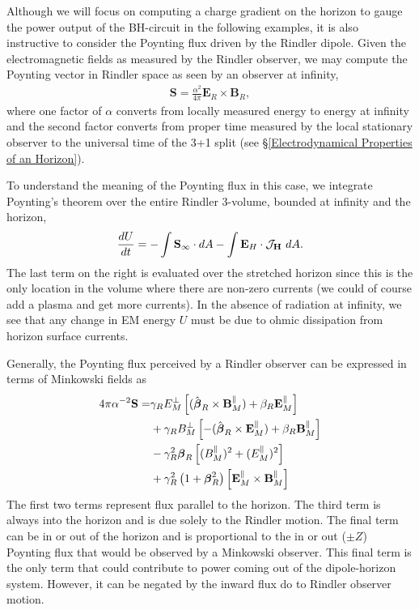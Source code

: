 Although we will focus on computing a charge gradient on the horizon
to gauge the power output of the BH-circuit in the following examples,
it is also instructive to
consider the Poynting flux driven by the Rindler dipole. Given the
electromagnetic fields as measured by the Rindler observer, we
may compute the Poynting vector in Rindler space as seen by an
observer at infinity,
\begin{align}
\mathbf{S} = \frac{\alpha^2}{4 \pi} \mathbf{E}_R \times \mathbf{B}_R,
\label{RPoynt}
\end{align}
where one factor of $\alpha$ converts from locally measured energy to energy at infinity and the second factor converts from proper time measured by the local stationary observer to the universal time of the 3+1 split (see \S \ref{Electrodynamical Properties  of an Horizon}).

To understand the meaning of the Poynting flux in this case, we integrate Poynting's theorem over the entire Rindler 3-volume, bounded at infinity and the horizon,
 \begin{align}
 \frac{d U}{dt} = -\int{ \mathbf{S}_{\infty} \cdot dA} - \int{ \mathbf{E}_H \cdot  \mathbf{\mathcal{J}_H}  \hbox{ }  dA}.
 \label{PoyntThm}
 \end{align}
The last term on the right is evaluated over the stretched horizon
since this is the only location in the volume where there are non-zero
currents (we could of course add a plasma and get more currents).  In
the absence of radiation at infinity, we see that any change in EM energy 
$U$ must be due to ohmic dissipation from horizon surface currents. 

Generally, the Poynting flux perceived by a Rindler observer can
be expressed in terms of Minkowski fields as 
\begin{align}
4\pi\alpha^{-2} {\bf S}= & \gamma_R E_M^\perp \left [ (\hat{\boldsymbol \beta}_R \times
  {\bf B}_M^\parallel) +\beta_R {\bf E}_M^\parallel \right ]  \nonumber \\
& + \gamma_R B_M^\perp \left [- (\hat{\boldsymbol \beta}_R \times
  {\bf E}_M^\parallel) +\beta_R {\bf B}_M^\parallel \right ]  \nonumber \\
& - \gamma_R^2 {\boldsymbol \beta}_R \left [ (B_M^{\parallel})^2+(E_M^{\parallel})^2 \right] \nonumber \\
& +\gamma_R^2 \left(1+ {\boldsymbol \beta}_R^2 \right) \left [{\bf E}_M^\parallel \times {\bf B}_M^\parallel\right ]
\label{Eq:Poynt}
\end{align}
The first two terms represent flux parallel to the horizon.
The third term is always into the horizon and is due solely to the
Rindler motion. The final term
can be in or out of the horizon and is proportional to the in or out ($\pm Z$) Poynting flux that would be
observed by a Minkowski observer. This final term is the only term that could contribute to power coming 
out of the dipole-horizon system. However, it can be negated by the inward flux do to Rindler observer motion.



